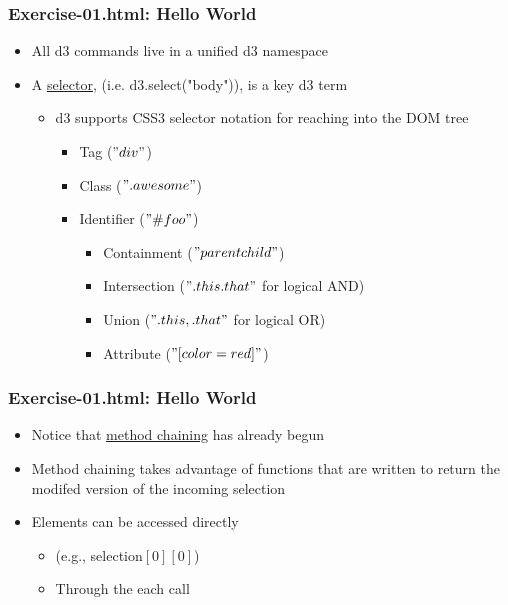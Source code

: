 \documentclass{beamer}
\begin{document}
\begin{frame}
    \frametitle{Exercise-01.html: Hello World}
    \begin{itemize}
    \item All d3 commands live in a unified d3 namespace
    \item A \underline{selector}, (i.e. d3.select("body")), is a key d3 term
        \begin{itemize}
        \item d3 supports CSS3 selector notation for reaching into the DOM tree
            \begin{itemize}
            \item Tag ($"div"$)
            \item Class ($".awesome"$)
            \item Identifier ($"\#foo"$)
                \begin{itemize}
                \item Containment ($"parent child"$)
                \item Intersection ($".this.that"$ for logical AND) 
                \item Union ($".this, .that"$ for logical OR)
                \item Attribute ($"[color=red]"$)
                \end{itemize}
            \end{itemize}
        \end{itemize}
    \end{itemize}
\end{frame}


\begin{frame}
    \frametitle{Exercise-01.html: Hello World}
    \begin{itemize}
    \item Notice that \underline{method chaining} has already begun
    \item Method chaining takes advantage of functions that are written to return the modifed version of the incoming selection
    \item Elements can be accessed directly
        \begin{itemize}
        \item (e.g., selection$[0][0]$)
        \item Through the each call
        \end{itemize}
    \end{itemize}
\end{frame}
\end{document}
